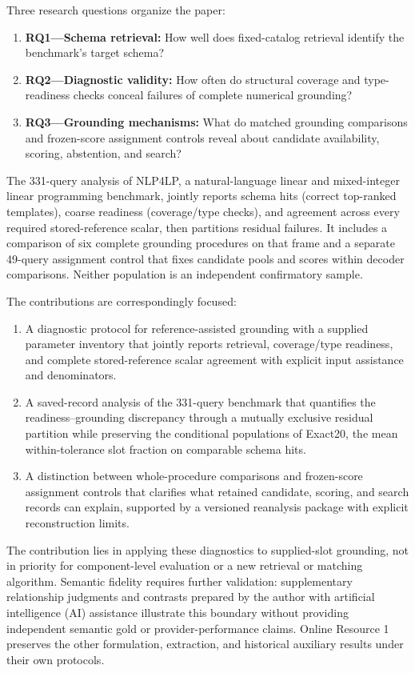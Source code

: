 \documentclass[pdflatex,iicol,sn-basic,Numbered]{sn-jnl}
\begin{document}
Three research questions organize the paper:
\begin{enumerate}
\item \textbf{RQ1---Schema retrieval:} How well does fixed-catalog retrieval identify the benchmark's target schema?
\item \textbf{RQ2---Diagnostic validity:} How often do structural coverage and type-readiness checks conceal failures of complete numerical grounding?
\item \textbf{RQ3---Grounding mechanisms:} What do matched grounding comparisons and frozen-score assignment controls reveal about candidate availability, scoring, abstention, and search?
\end{enumerate}

The 331-query analysis of NLP4LP, a natural-language linear and mixed-integer linear programming benchmark, jointly reports schema hits (correct top-ranked templates), coarse readiness (coverage/type checks), and agreement across every required stored-reference scalar, then partitions residual failures. It includes a comparison of six complete grounding procedures on that frame and a separate 49-query assignment control that fixes candidate pools and scores within decoder comparisons. Neither population is an independent confirmatory sample.

The contributions are correspondingly focused:
\label{subsec:intro_contributions}
\begin{enumerate}
\item A diagnostic protocol for reference-assisted grounding with a supplied parameter inventory that jointly reports retrieval, coverage/type readiness, and complete stored-reference scalar agreement with explicit input assistance and denominators.
\item A saved-record analysis of the 331-query benchmark that quantifies the readiness--grounding discrepancy through a mutually exclusive residual partition while preserving the conditional populations of Exact20, the mean within-tolerance slot fraction on comparable schema hits.
\item A distinction between whole-procedure comparisons and frozen-score assignment controls that clarifies what retained candidate, scoring, and search records can explain, supported by a versioned reanalysis package with explicit reconstruction limits.
\end{enumerate}

The contribution lies in applying these diagnostics to supplied-slot grounding, not in priority for component-level evaluation or a new retrieval or matching algorithm. Semantic fidelity requires further validation: supplementary relationship judgments and contrasts prepared by the author with artificial intelligence (AI) assistance illustrate this boundary without providing independent semantic gold or provider-performance claims. Online Resource 1 preserves the other formulation, extraction, and historical auxiliary results under their own protocols.
\end{document}
